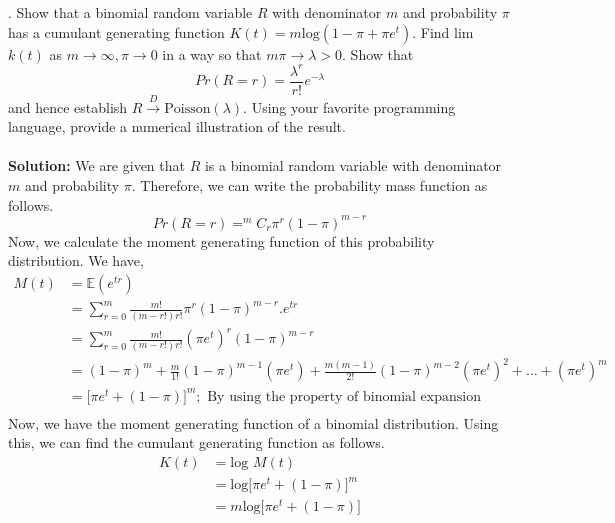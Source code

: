 \documentclass[11pt]{article}
\begin{document}
. Show that a binomial random variable $R$ with denominator $m$ and probability $\pi$ has a cumulant generating function $K(t) = m \text{log}(1 - \pi + \pi e^{t})$. Find lim $k(t)$ as $m \xrightarrow{} \infty, \pi \xrightarrow{} 0$ in a way so that $m\pi \xrightarrow{} \lambda > 0$. Show that
\begin{equation}
  \nonumber
  Pr(R = r) = \frac{\lambda^{r}}{r!}e^{-\lambda}
\end{equation}
and hence establish $R \xrightarrow{D} \text{Poisson}(\lambda)$. Using your favorite programming language, provide a numerical illustration of the result.\\ \\
\textbf{Solution:} We are given that $R$ is a binomial random variable with denominator $m$ and probability $\pi$. Therefore, we can write the probability mass function as follows.
\begin{equation}
  \nonumber
  Pr(R = r) = ^{m}C_{r} \pi^{r}(1-\pi)^{m-r}
\end{equation}
Now, we calculate the moment generating function of this probability distribution. We have,
\begin{equation}
  \nonumber
  \begin{aligned}
    M(t) & = \mathbb{E}(e^{tr})\\
    & = \sum_{r = 0}^{m} \frac{m!}{(m-r!)r!} \pi^{r}(1-\pi)^{m-r}.e^{tr}\\
    & = \sum_{r = 0}^{m} \frac{m!}{(m-r!)r!} (\pi e^{t})^{r}(1 - \pi)^{m-r}\\
    & = (1-\pi)^{m} + \frac{m}{1!}(1-\pi)^{m-1}(\pi e^{t}) + \frac{m(m-1)}{2!}(1-\pi)^{m-2}(\pi e^{t})^{2} + \dots + (\pi e^{t})^{m}\\
    & = \big[\pi e^{t} + (1 - \pi)\big]^{m}; \text{ By using the property of binomial expansion}\\
  \end{aligned}
\end{equation}
Now, we have the moment generating function of a binomial distribution. Using this, we can find the cumulant generating function as follows.
\begin{equation}
  \nonumber
  \begin{aligned}
    K(t) & = \text{log } M(t) \\
    & = \text{log} \big[\pi e^{t} + (1 - \pi)\big]^{m}\\
    & = m \text{log} \big[\pi e^{t} + (1 - \pi)\big]
  \end{aligned}
\end{equation}
\end{document}

